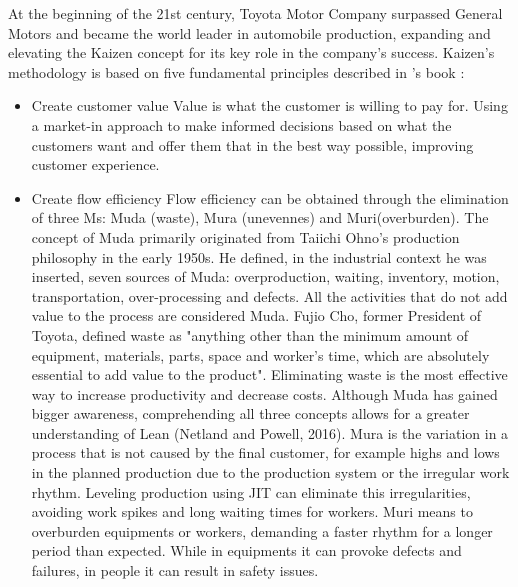 \documentclass[]{article}
\begin{document}
At the beginning of the 21st century, Toyota Motor Company surpassed General Motors and
became the world leader in automobile production, expanding and elevating the Kaizen concept
for its key role in the company’s success. Kaizen’s methodology is based on five
fundamental principles described in \citeauthor{massaki_gemba_2015}'s book \cite{massaki_gemba_2015} :
\begin{itemize}
  \item Create customer value
    \subitem Value is what the customer is willing to pay for. Using a market-in approach to make
informed decisions based on what the customers want and offer them that in the best way
possible, improving customer experience.
  
  \item Create flow efficiency
    \subitem Flow efficiency can be obtained through the elimination of three Ms: Muda (waste), Mura (unevennes) and Muri(overburden).
    The concept of Muda primarily originated from Taiichi Ohno’s production philosophy in the
    early 1950s. He defined, in the industrial context he was inserted, seven sources of Muda:
    overproduction, waiting, inventory, motion, transportation, over-processing and defects. All
    the activities that do not add value to the process are considered Muda. Fujio Cho, former
    President of Toyota, defined waste as "anything other than the minimum amount of equipment, materials, parts, space and worker’s time, which are absolutely essential to add value
    to the product". Eliminating waste is the most effective way to increase productivity and
    decrease costs.
    Although Muda has gained bigger awareness, comprehending all three concepts allows for
    a greater understanding of Lean (Netland and Powell, 2016). Mura is the variation in a
    process that is not caused by the final customer, for example highs and lows in the planned
    production due to the production system or the irregular work rhythm. Leveling production
    using JIT can eliminate this irregularities, avoiding work spikes and long waiting times for
    workers. Muri means to overburden equipments or workers, demanding a faster rhythm for
    a longer period than expected. While in equipments it can provoke defects and failures, in
    people it can result in safety issues.


\end{itemize}
\end{document}

